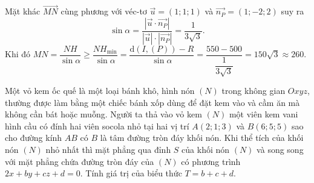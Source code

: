 \begin{ex}
{{
		}
		\noindent
		Mặt khác $\overrightarrow{MN}$ cùng phương với véc-tơ $\overrightarrow{u}=\left(1;1;1\right)$ và $\overrightarrow{n_P}=(1;-2;2)$ suy ra 
		\[
		\sin \alpha=\dfrac{\left|\overrightarrow{u}\cdot \overrightarrow{n_P}\right|}{\left|\overrightarrow{u}\right|\cdot \left|\overrightarrow{n_P}\right|}=\dfrac{1}{3\sqrt{3}}.
		\]
		Khi đó $MN=\dfrac{NH}{\sin \alpha} \ge \dfrac{NH_{\min}}{\sin \alpha}=\dfrac{\mathrm{d}\left(I,(P)\right)-R}{\sin \alpha}=\dfrac{550-500}{\dfrac{1}{3\sqrt{3}}}=150\sqrt{3} \approx 260$.
	}
\end{ex}

\begin{ex}%
	Một vỏ kem ốc quế là một loại bánh khô, hình nón $(N)$ trong không gian $Oxyz$, thường được làm bằng một chiếc bánh xốp dùng để đặt kem vào và cầm ăn mà không cần bát hoặc muỗng. Người ta thả vào vỏ kem $(N)$ một viên kem vani hình cầu có đính hai viên socola nhỏ tại hai vị trí $A(2; 1; 3)$ và $B(6; 5; 5)$ sao cho đường kính $AB$ có $B$ là tâm đường tròn đáy khối nón. Khi thể tích của khối nón $(N)$ nhỏ nhất thì mặt phẳng qua đỉnh $S$ của khối nón $(N)$ và song song với mặt phẳng chứa đường tròn đáy của $(N)$ có phương trình $2x+by+cz+d=0$. Tính giá trị của biểu thức $T=b+c+d$.\\
\end{ex}
